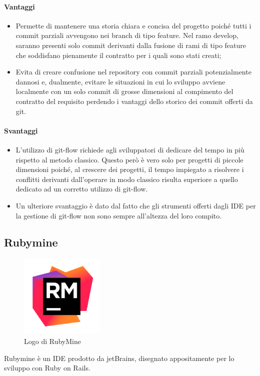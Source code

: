 \paragraph{Vantaggi} 
\begin{itemize}
	\item Permette di mantenere una storia chiara e concisa del progetto poiché tutti i commit parziali avvengono nei branch di tipo feature.  Nel ramo develop, saranno presenti solo commit derivanti dalla fusione di rami di tipo feature che soddisfano pienamente il contratto per i quali sono stati creati;
	\item Evita di creare confusione nel repository con commit parziali potenzialmente dannosi e, dualmente, evitare le situazioni in cui lo sviluppo avviene localmente con un solo commit di grosse dimensioni al compimento del contratto del requisito perdendo i vantaggi dello storico dei commit offerti da git.
\end{itemize}
\paragraph{Svantaggi}
\begin{itemize}
	\item L'utilizzo di git-flow richiede agli sviluppatori di dedicare del tempo in più rispetto al metodo classico. Questo però è vero solo per progetti di piccole dimensioni poiché, al crescere dei progetti, il tempo impiegato a risolvere i conflitti derivanti dall'operare in modo classico risulta superiore a quello dedicato ad un corretto utilizzo di git-flow.
	\item Un ulteriore svantaggio è dato dal fatto che gli strumenti offerti dagli IDE per la gestione di git-flow non sono sempre all'altezza del loro compito.
\end{itemize}

\subsection{Rubymine}

\begin{figure}[H]
\begin{center}
\includegraphics[width=4cm]{Pics/rubymine_logo.png}
\caption{Logo di RubyMine}
\label{fig:RubyMine}
\end{center}
\end{figure}
Rubymine è un IDE prodotto da jetBrains, disegnato appositamente per lo sviluppo con Ruby on Rails.
